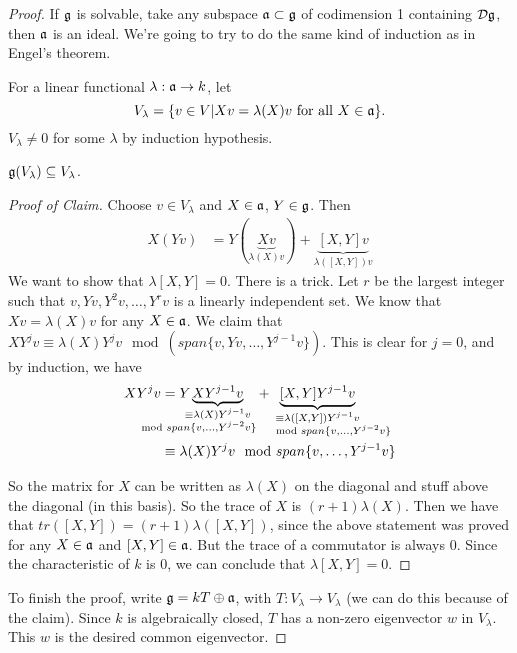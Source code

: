  \begin{proof}
   If $\mathfrak{g}$ is solvable, take any subspace $\mathfrak{a}\subset \mathfrak{g}$ of codimension 1 containing
   $\mathcal{D}\mathfrak{g}$, then $\mathfrak{a}$ is an ideal. We're going to try to do the same kind of induction
   as in Engel's theorem.

   For a linear functional $\lambda: \mathfrak{a}\to k$, let
   \[
    V_\lambda=\{v\in V| Xv = \lambda(X)v \text{ for all } X\in \mathfrak{a}\}.
   \]
   $V_\lambda\neq 0$ for some $\lambda$ by induction hypothesis.
 \begin{claim}
   $\mathfrak{g}(V_\lambda)\subseteq V_\lambda$.
 \end{claim}
 \begin{proof}[Proof of Claim]
  Choose $v\in V_\lambda$ and $X\in \mathfrak{a}$, $Y\in \mathfrak{g}$. Then
  \begin{align*}
    X(Yv) &= Y(\underbrace{Xv}_{\lambda(X)v}) +
    \underbrace{[X,Y]v}_{\lambda([X,Y])v}
  \end{align*}
  We want to show that $\lambda[X,Y]=0$. There is a trick. Let $r$ be the largest
  integer such that $v, Yv, Y^2v, \dots, Y^r v$ is a linearly independent set. We know
  that $Xv=\lambda(X)v$ for any $X\in \mathfrak{a}$. We claim that $XY^jv \equiv \lambda(X)Y^jv
  \mod (span\{v,Yv,\ldots,Y^{j-1}v\})$. This is clear for $j=0$, and by induction, we
  have
  \begin{align*}
    X Y^j v & = Y\hspace{-1em}\underbrace{XY^{j-1}v}_{
                \substack{\equiv \lambda(X)Y^{j-1}v \\
                \hspace{-3.25em} \mod span\{v,\dots, Y^{j-2}v\}}}
                +\hspace{-2em} \underbrace{[X,Y]Y^{j-1}v}_{%
                    \substack{\equiv \lambda([X,Y])Y^{j-1}v \\ \hspace{1.75em}
                    \mod span\{v,\dots, Y^{j-2}v\}}}\\
      &\equiv \lambda(X) Y^j v \mod span\{v,\dots, Y^{j-1}v\}
  \end{align*}

  So the matrix for $X$ can be written as $\lambda(X)$ on the diagonal and stuff above
  the diagonal (in this basis). So the trace of $X$ is $(r+1)\lambda(X)$. Then we have
  that $tr([X,Y])=(r+1)\lambda([X,Y])$, since the above statement was proved for any
  $X\in \mathfrak{a}$ and $[X,Y]\in\mathfrak{a}$. But the trace of a commutator is always 0. Since the
  characteristic of $k$ is 0, we can conclude that $\lambda[X,Y]=0$.
 \renewcommand{\qedsymbol}{$\square_{\text{Claim}}$}
 \end{proof}
 To finish the proof, write $\mathfrak{g}=kT\oplus \mathfrak{a}$, with $T:V_{\lambda}\to V_\lambda$ (we
 can do this because of the claim). Since $k$ is algebraically closed, $T$ has a
 non-zero eigenvector $w$ in $V_\lambda$. This $w$ is the desired common eigenvector.
 \end{proof}
